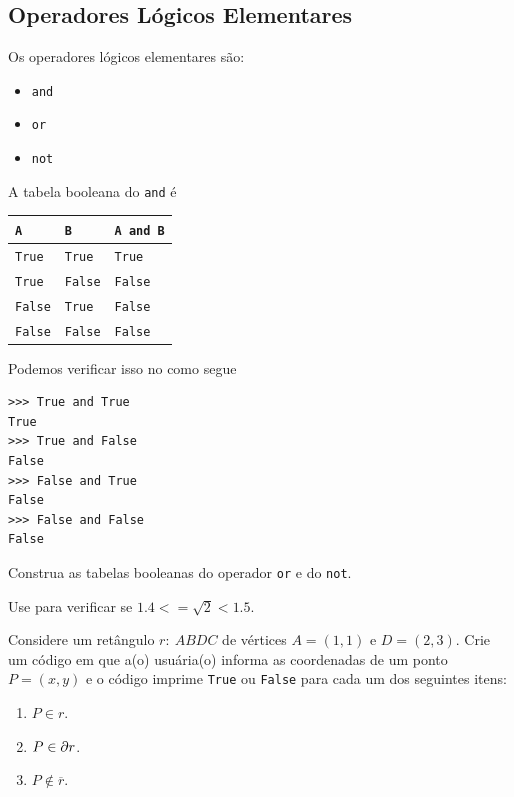 \documentclass[12pt]{article}
\begin{document}
\subsection{Operadores Lógicos Elementares}

Os operadores lógicos elementares são:
\begin{itemize}
\item[]\lstinline+and+ 
\item[]\lstinline+or+ 
\item[]\lstinline+not+ 
\end{itemize}

\begin{ex}
  A tabela booleana{\boole} do \verb+and+ é
  \begin{center}
    \begin{tabular}[H]{ll|l}
      {\lstinline+A+} & {\lstinline+B+} &  {\lstinline+A and B+}\\\hline
      {\lstinline+True+} & {\lstinline+True+} & {\lstinline+True+} \\
      {\lstinline+True+} & {\lstinline+False+} & {\lstinline+False+} \\
      {\lstinline+False+} & {\lstinline+True+} & {\lstinline+False+} \\
      {\lstinline+False+} & {\lstinline+False+} & {\lstinline+False+} \\\hline
    \end{tabular}
  \end{center}
  Podemos verificar isso no {\python} como segue
\begin{lstlisting}
>>> True and True
True
>>> True and False
False
>>> False and True
False
>>> False and False
False
\end{lstlisting}
\end{ex}

\begin{exr}
  Construa as tabelas booleanas do operador \lstinline+or+ e do \lstinline+not+.
\end{exr}

\begin{exr}
  Use {\python} para verificar se $1.4 <= \sqrt{2} < 1.5$.
\end{exr}

\begin{exr}
  Considere um retângulo $r: ~ABDC$ de vértices $A = (1, 1)$ e $D = (2, 3)$. Crie um código em que a(o) usuária(o) informa as coordenadas de um ponto $P = (x, y)$ e o código imprime \lstinline+True+ ou \lstinline+False+ para cada um dos seguintes itens:
  \begin{enumerate}
  \item $P\in r$.
  \item $P\in \partial r$.
  \item $P\not\in \overline{r}$.
  \end{enumerate}
\end{exr}
\end{document}
